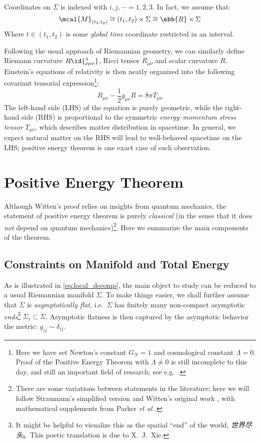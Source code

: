 \documentclass[a4paper,11pt]{article}
\begin{document}
	Coordinates on $\Sigma$ is indexed with $i,j,\cdots = 1,2,3$. In fact, we assume that:
	\begin{equation}
		\mcal{M}_{(t_1,t_2)}
		\cong (t_1,t_2) \times \Sigma
		\cong \mbb{R} \times \Sigma
		\label{eq:local_decomp}
	\end{equation}
	Where $t\in (t_1,t_2)$ is some \textit{global time} coordinate restricted in an interval. 
	
	Following the usual approach of Riemannian geometry, we can similarly define Riemann curvature $R\id{^\lambda_{\rho\mu\nu}}$, Ricci tensor $R_{\mu\nu}$ and scalar curvature $R$. Einstein's equations of relativity is then neatly organized into the following covariant tensorial expression\footnote{
		Here we have set Newton's constant $G_N = 1$ and cosmological constant $\Lambda = 0$. Proof of the Positive Energy Theorem with $\Lambda\ne 0$ is still incomplete to this day, and still an important field of research; see e.g.~\cite{Zhang:2015iua}. 
	}:
	\begin{equation}
		R_{\mu\nu} - \frac{1}{2} g_{\mu\nu} R
		= 8\pi T_{\mu\nu}
		\label{eq:einstein}
	\end{equation}
	The left-hand side (LHS) of the equation is purely geometric, while the right-hand side (RHS) is proportional to the symmetric \textit{energy--momentum stress tensor} $T_{\mu\nu}$, which describes matter distribution in spacetime. In general, we expect natural matter on the RHS will lead to well-behaved spacetime on the LHS; positive energy theorem is one exact case of such observation. 
\section{Positive Energy Theorem}
	Although Witten's proof relies on insights from quantum mechanics, the statement of positive energy theorem is purely \textit{classical} (in the sense that it does \textit{not} depend on quantum mechanics)\footnote{
		There are some variations between statements in the literature; here we will follow {Straumann}'s simplified version \cite{Straumann:2013spu} and {Witten}'s original work \cite{Witten:1981mf}, with mathematical supplements from Parker \textit{et al} \cite{Parker:1981uy}. 
	}. Here we summarize the main components of the theorem. 
\subsection{Constraints on Manifold and Total Energy}
\label{subsect:adm_energy}
	As is illustrated in \eqref{eq:local_decomp}, the main object to study can be reduced to a usual Riemannian manifold $\Sigma$. To make things easier, we shall further assume that $\Sigma$ is \textit{asymptotically flat}, i.e.~$\Sigma$ has finitely many non-compact asymptotic \textit{ends}\footnote{
		It might be helpful to visualize this as the spatial ``end'' of the world, \textit{世界尽头}。This poetic translation is due to X.~J.~Xie. 
	} $\Sigma_\ell \subset \Sigma$. Asymptotic flatness is then captured by the asymptotic behavior the metric: $g_{ij}\sim \delta_{ij}$. 
	
\end{document}
